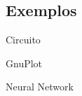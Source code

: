 \subsection*{Exemplos}
\begin{frame}{Circuito}
	
\end{frame}

\begin{frame}{GnuPlot}
	
\end{frame}

\begin{frame}[shrink=30]{Neural Network}
	
\end{frame}